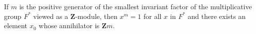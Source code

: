 If $m$ is the positive generator of the smallest invariant factor of the multiplicative group $F^*$ viewed as a $\mathbf{Z}$-module, then $x^m = 1$ for all $x$ in $F^*$ and there exists an element $x_0$ whose annihilator is $\mathbf{Z}m$.
